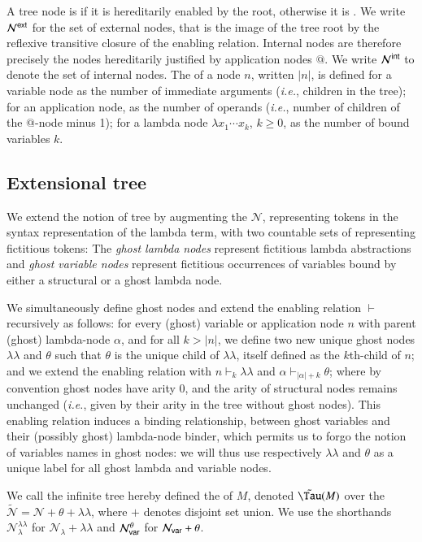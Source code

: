 \documentclass{elsarticle}
\makeatletter
\theoremstyle{plain}
\theoremstyle{definition}
\newcommand\Nodes{\mathcal{N}}%
\newcommand\NodesVar{\Nodes_{\sf var}}%
\newcommand\NodesLmd{\Nodes_\lambda}%
\newcommand{\ghostlmd}{{\lambda\!\!\lambda}}
\newcommand{\ghostvar}{\theta}
\newcommand\ExtendedNodes{\tilde{\Nodes}}
\newcommand\ExtendedNodesVar{\NodesVar^\ghostvar}
\newcommand\ExtendedNodesLmd{\NodesLmd^\ghostlmd}
\newcommand{\enables}{\vdash} %
\newcommand{\exttree}{\tilde{\Tau}} %
\newcommand{\ExternalNodes}{\Nodes^{\sf ext}}
\newcommand{\InternalNodes}{\Nodes^{\sf int}}
\renewcommand\ie{{\it i.e.\@\xspace}}
\makeatother
\begin{document}
A tree node is  if it is hereditarily enabled by the root, otherwise it is . We write $\ExternalNodes$ for the set of external nodes, that is the image of the tree root by the reflexive transitive closure of the enabling relation. Internal nodes are therefore precisely the nodes hereditarily justified by application nodes $@$. We write $\InternalNodes$ to denote the set of internal nodes.
The  of a node $n$, written $|n|$,
is defined for a variable node as the number of immediate arguments (\ie, children in the tree); for an application node, as the number of operands (\ie, number of children of the $@$-node minus 1); for a lambda node $\lambda x_1 \cdots x_k$, $k\geq 0$, as the number of bound variables $k$.

\subsection{Extensional tree}
We extend the notion of tree by augmenting the
  $\Nodes$, representing tokens in the syntax representation of the lambda term,
with two countable sets of  representing fictitious tokens: The \emph{ghost lambda nodes}
represent fictitious lambda abstractions
and \emph{ghost variable nodes} represent fictitious
occurrences of variables bound by either a structural or a ghost lambda node.

We simultaneously define ghost nodes and extend the enabling relation $\enables$ recursively as follows: for every (ghost) variable or application node $n$ with parent (ghost) lambda-node $\alpha$, and for all $k>|n|$, we define two new unique ghost nodes $\ghostlmd$ and $\ghostvar$
such that
$\ghostvar$ is the unique child of $\ghostlmd$, itself defined as the $k$th-child of $n$;
and we extend the enabling relation with $n \enables_k \ghostlmd$
and $\alpha \enables_{|\alpha|+ k} \ghostvar$; where by convention ghost nodes have arity $0$, and the arity of structural nodes remains unchanged (\ie, given by their arity in the tree without ghost nodes).
This enabling relation induces a binding relationship, between ghost variables and their (possibly ghost) lambda-node binder, which permits us to forgo the notion of variables names in ghost nodes: we will thus
use respectively $\ghostlmd$ and $\ghostvar$ as a unique label for all ghost lambda and variable nodes.

We call the infinite tree hereby defined the  of $M$,
denoted $\exttree(M)$ over the  $\ExtendedNodes = \Nodes + \ghostvar + \ghostlmd$, where $+$ denotes disjoint set union. We use the shorthands $\ExtendedNodesLmd$ for $\NodesLmd + \ghostlmd$ and $\ExtendedNodesVar$ for $\NodesVar + \ghostvar$.
\end{document}
